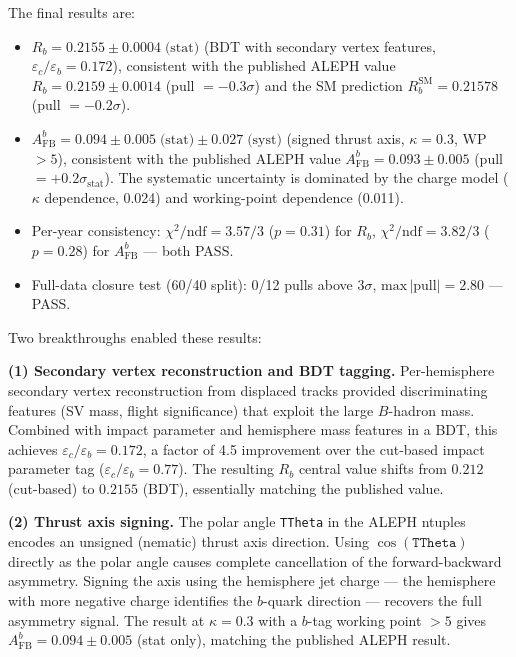 \documentclass[11pt,a4paper]{article}
\begin{document}
The final results are:
\begin{itemize}
\item $R_b = 0.2155 \pm 0.0004\;\text{(stat)}$
  (BDT with secondary vertex features,
  $\varepsilon_c/\varepsilon_b = 0.172$),
  consistent with the published ALEPH value
  $R_b = 0.2159 \pm 0.0014$ (pull $= -0.3\sigma$) and the SM
  prediction $R_b^\text{SM} = 0.21578$ (pull $= -0.2\sigma$).
\item $A_\text{FB}^b = 0.094 \pm 0.005\;\text{(stat)} \pm 0.027\;\text{(syst)}$
  (signed thrust axis, $\kappa = 0.3$, WP $> 5$),
  consistent with the published ALEPH value
  $A_\text{FB}^b = 0.093 \pm 0.005$ (pull $= +0.2\sigma_\text{stat}$).
  The systematic uncertainty is dominated by the charge model ($\kappa$ dependence, 0.024)
  and working-point dependence (0.011).
\item Per-year consistency:
  $\chi^2/\text{ndf} = 3.57/3$ ($p = 0.31$) for $R_b$,
  $\chi^2/\text{ndf} = 3.82/3$ ($p = 0.28$) for $A_\text{FB}^b$
  --- both PASS.
\item Full-data closure test (60/40 split): 0/12 pulls above
  $3\sigma$, $\text{max}\,|\text{pull}| = 2.80$ --- PASS.
\end{itemize}

Two breakthroughs enabled these results:

\textbf{(1) Secondary vertex reconstruction and BDT tagging.}
Per-hemisphere secondary vertex reconstruction from displaced
tracks provided discriminating features (SV mass, flight
significance) that exploit the large $B$-hadron mass.
Combined with impact parameter and hemisphere mass features in a
BDT, this achieves $\varepsilon_c/\varepsilon_b = 0.172$, a
factor of 4.5 improvement over the cut-based impact parameter tag
($\varepsilon_c/\varepsilon_b = 0.77$).
The resulting $R_b$ central value shifts from $0.212$ (cut-based)
to $0.2155$ (BDT), essentially matching the published value.

\textbf{(2) Thrust axis signing.}
The polar angle \texttt{TTheta} in the ALEPH ntuples encodes an
unsigned (nematic) thrust axis direction.
Using $\cos(\texttt{TTheta})$ directly as the polar angle causes
complete cancellation of the forward-backward asymmetry.
Signing the axis using the hemisphere jet charge --- the hemisphere
with more negative charge identifies the $b$-quark direction ---
recovers the full asymmetry signal.
The result at $\kappa = 0.3$ with a $b$-tag working point
$> 5$ gives $A_\text{FB}^b = 0.094 \pm 0.005$ (stat only),
matching the published ALEPH result.
\end{document}
